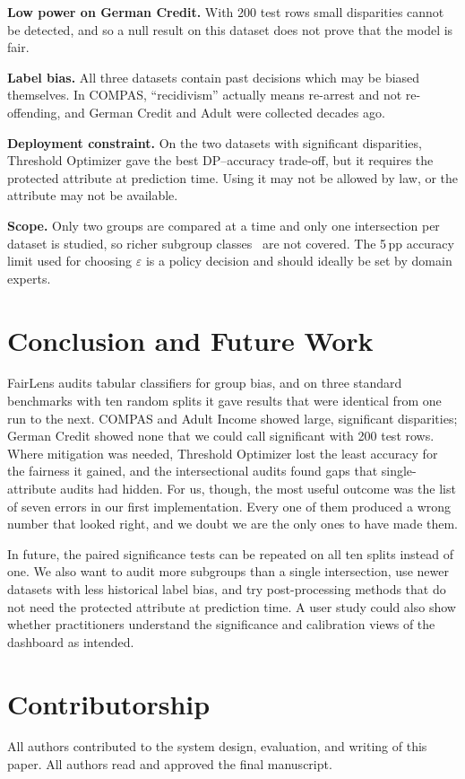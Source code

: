 \documentclass[conference]{IEEEtran}
\newcommand{\eps}{\varepsilon}
\begin{document}
\textbf{Low power on German Credit.} With 200 test rows small disparities cannot be detected, and so a null result on this dataset does not prove that the model is fair.

\textbf{Label bias.} All three datasets contain past decisions which may be biased themselves. In COMPAS, ``recidivism'' actually means re-arrest and not re-offending, and German Credit and Adult were collected decades ago.

\textbf{Deployment constraint.} On the two datasets with significant disparities, Threshold Optimizer gave the best DP--accuracy trade-off, but it requires the protected attribute at prediction time. Using it may not be allowed by law, or the attribute may not be available.

\textbf{Scope.} Only two groups are compared at a time and only one intersection per dataset is studied, so richer subgroup classes~\cite{kearns2018preventing} are not covered. The 5\,pp accuracy limit used for choosing $\eps$ is a policy decision and should ideally be set by domain experts.

\section{Conclusion and Future Work}
FairLens audits tabular classifiers for group bias, and on three standard benchmarks with ten random splits it gave results that were identical from one run to the next. COMPAS and Adult Income showed large, significant disparities; German Credit showed none that we could call significant with 200 test rows. Where mitigation was needed, Threshold Optimizer lost the least accuracy for the fairness it gained, and the intersectional audits found gaps that single-attribute audits had hidden. For us, though, the most useful outcome was the list of seven errors in our first implementation. Every one of them produced a wrong number that looked right, and we doubt we are the only ones to have made them.

In future, the paired significance tests can be repeated on all ten splits instead of one. We also want to audit more subgroups than a single intersection, use newer datasets with less historical label bias, and try post-processing methods that do not need the protected attribute at prediction time. A user study could also show whether practitioners understand the significance and calibration views of the dashboard as intended.

\section*{Contributorship}
All authors contributed to the system design, evaluation, and writing of this paper. All authors read and approved the final manuscript.

\balance


\end{document}
